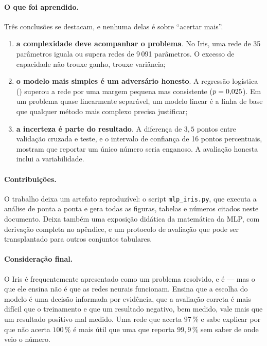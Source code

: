 \paragraph{O que foi aprendido.} Três conclusões se destacam, e nenhuma delas é sobre ``acertar
mais''.

\begin{enumerate}
	\item \textbf{a complexidade deve acompanhar o problema}. No Iris, uma rede de 35 parâmetros
	      iguala ou supera redes de 9\,091 parâmetros. O excesso de capacidade não trouxe ganho,
	      trouxe variância;
	\item \textbf{o modelo mais simples é um adversário honesto}. A regressão logística
	      (\accLR{}) superou a rede por uma margem pequena mas consistente
	      ($p=0{,}025$). Em um problema quase linearmente separável, um modelo linear é a linha de
	      base que qualquer método mais complexo precisa justificar;
	\item \textbf{a incerteza é parte do resultado}. A diferença de $3{,}5$ pontos entre validação
	      cruzada e teste, e o intervalo de confiança de 16 pontos percentuais, mostram que
	      reportar um único número seria enganoso. A avaliação honesta inclui a variabilidade.
\end{enumerate}

\paragraph{Contribuições.} O trabalho deixa um artefato reproduzível: o script
\texttt{mlp\_iris.py}, que executa a análise de ponta a ponta e gera todas as figuras, tabelas e
números citados neste documento. Deixa também uma exposição didática da matemática da MLP, com
derivação completa no apêndice, e um protocolo de avaliação que pode ser transplantado para outros
conjuntos tabulares.

\paragraph{Consideração final.} O Iris é frequentemente apresentado como um problema resolvido, e
é --- mas o que ele ensina não é que as redes neurais funcionam. Ensina que a escolha do modelo é
uma decisão informada por evidência, que a avaliação correta é mais difícil que o treinamento e
que um resultado negativo, bem medido, vale mais que um resultado positivo mal medido. Uma rede
que acerta $97\,\%$ e sabe explicar por que não acerta $100\,\%$ é mais útil que uma que reporta
$99{,}9\,\%$ sem saber de onde veio o número.
